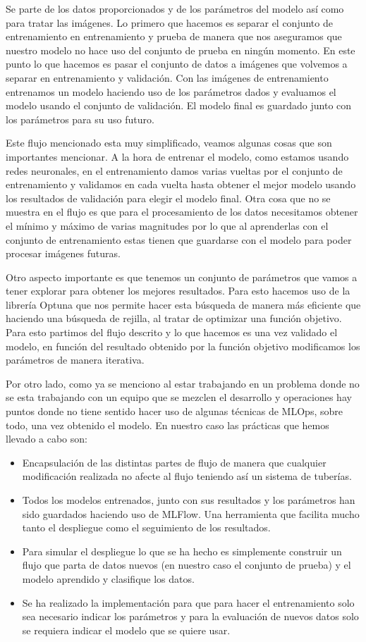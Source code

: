 \documentclass[a4paper,12pt,twoside,titlepage]{article}
\begin{document}
Se parte de los datos proporcionados y de los parámetros del modelo así como para tratar las imágenes. Lo primero que hacemos es separar el conjunto de entrenamiento en entrenamiento y prueba de manera que nos aseguramos que nuestro modelo no hace uso del conjunto de prueba en ningún momento. En este punto lo que hacemos es pasar el conjunto de datos a imágenes que volvemos a separar en entrenamiento y validación. Con las imágenes de entrenamiento entrenamos un modelo haciendo uso de los parámetros dados y evaluamos el modelo usando el conjunto de validación. El modelo final es guardado junto con los parámetros para su uso futuro.

Este flujo mencionado esta muy simplificado, veamos algunas cosas que son importantes mencionar. A la hora de entrenar el modelo, como estamos usando redes neuronales, en el entrenamiento damos varias vueltas por el conjunto de entrenamiento y validamos en cada vuelta hasta obtener el mejor modelo usando los resultados de validación para elegir el modelo final. Otra cosa que no se muestra en el flujo es que para el procesamiento de los datos necesitamos obtener el mínimo y máximo de varias magnitudes por lo que al aprenderlas con el conjunto de entrenamiento estas tienen que guardarse con el modelo para poder procesar imágenes futuras.

Otro aspecto importante es que tenemos un conjunto de parámetros que vamos a tener explorar para obtener los mejores resultados. Para esto hacemos uso de la librería Optuna que nos permite hacer esta búsqueda de manera más eficiente que haciendo una búsqueda de rejilla, al tratar de optimizar una función objetivo. Para esto partimos del flujo descrito y lo que hacemos es una vez validado el modelo, en función del resultado obtenido por la función objetivo modificamos los parámetros de manera iterativa.

Por otro lado, como ya se menciono al estar trabajando en un problema donde no se esta trabajando con un equipo que se mezclen el desarrollo y operaciones hay puntos donde no tiene sentido hacer uso de algunas técnicas de MLOps, sobre todo, una vez obtenido el modelo. En nuestro caso las prácticas que hemos llevado a cabo son:
\begin{itemize}
  \item Encapsulación de las distintas partes de flujo de manera que cualquier modificación realizada no afecte al flujo teniendo así un sistema de tuberías.
  \item Todos los modelos entrenados, junto con sus resultados y los parámetros han sido guardados haciendo uso de MLFlow. Una herramienta que facilita mucho tanto el despliegue como el seguimiento de los resultados.
  \item Para simular el despliegue lo que se ha hecho es simplemente construir un flujo que parta de datos nuevos (en nuestro caso el conjunto de prueba) y el modelo aprendido y clasifique los datos. 
  \item Se ha realizado la implementación para que para hacer el entrenamiento solo sea necesario indicar los parámetros y para la evaluación de nuevos datos solo se requiera indicar el modelo que se quiere usar.
\end{itemize} 
\newpage
\end{document}
